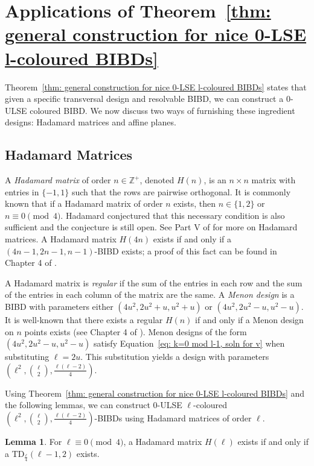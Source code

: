 \documentclass[12pt]{article}
\theoremstyle{definition}
\newtheorem{lemma}[theorem]{Lemma}
\begin{document}
\section{Applications of Theorem~\ref{thm: general construction for nice 0-LSE l-coloured BIBDs}}\label{sec: Applications of general construction}

Theorem~\ref{thm: general construction for nice 0-LSE l-coloured BIBDs} states that given a specific transversal design and resolvable BIBD, we can construct a $0$-ULSE coloured BIBD. We now discuss two ways of furnishing these ingredient designs: Hadamard matrices and affine planes. 


\subsection{Hadamard Matrices}\label{sec: Hadamard matrices}

A \emph{Hadamard matrix} of order $n\in \mathbb{Z}^+$, denoted $H(n)$, is an $n\times n$ matrix with entries in $\{-1, 1\}$ such that the rows are pairwise orthogonal. It is commonly known that if a Hadamard matrix of order $n$ exists, then $n\in \{1,2\}$ or $n\equiv 0 \pmod{4}$. Hadamard \cite{H1893} conjectured that this necessary condition is also sufficient and the conjecture is still open. See Part V of \cite{HCD} for more on Hadamard matrices. A Hadamard matrix $H(4n)$ exists if and only if a $(4n-1, 2n-1, n-1)$-BIBD exists; a proof of this fact can be found in Chapter 4 of \cite{S04}.

A Hadamard matrix is \emph{regular} if the sum of the entries in each row and the sum of the entries in each column of the matrix are the same. A \emph{Menon design} is a BIBD with parameters either $(4u^2, 2u^2 + u, u^2 + u)$ or $(4u^2, 2u^2 - u, u^2 - u)$. It is well-known that there exists a regular $H(n)$ if and only if a Menon design on $n$ points exists (see Chapter 4 of \cite{S04}). Menon designs of the form $(4u^2, 2u^2 - u, u^2 - u)$ satisfy Equation~\eqref{eq: k=0 mod l-1, soln for v} when substituting $\ell = 2u$. This substitution yields a design with parameters $\left(\ell^2, \binom{\ell}{2}, \frac{\ell(\ell - 2)}{4}\right)$. 

Using Theorem~\ref{thm: general construction for nice 0-LSE l-coloured BIBDs} and the following lemmas, we can construct $0$-ULSE $\ell$-coloured $\left(\ell^2, \binom{\ell}{2}, \frac{\ell(\ell - 2)}{4}\right)$-BIBDs using Hadamard matrices of order $\ell$.

\begin{lemma}\label{lem: H(4n) = TD_ell/4(ell - 1, 2)}
    For $\ell \equiv 0 \pmod{4}$, a Hadamard matrix $H(\ell)$ exists if and only if a TD$_{\frac{\ell}{4}}(\ell - 1, 2)$ exists.
\end{lemma}
\end{document}
